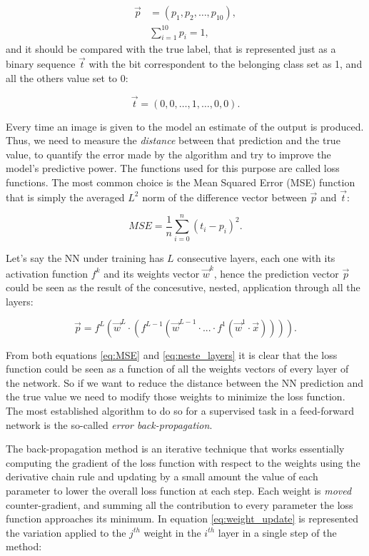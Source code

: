 \documentclass[12pt,a4paper]{report}
\begin{document}
\begin{align}
    \vec p & = (p_1, p_2, \dots, p_{10}), \\
    &\sum_{i=1}^{10} p_i = 1,
\end{align}
and it should be compared with the true label, that is represented just as a binary sequence $\vec t$ with the bit correspondent to the belonging class set as 1, and all the others value set to 0:

\begin{equation}
    \vec t = (0,0,\dots, 1, \dots,0,0).
\end{equation}

Every time an image is given to the model an estimate of the output is produced. Thus, we need to measure the \textit{distance} between that prediction and the true value, to quantify the error made by the algorithm and try to improve the model's predictive power. The functions used for this purpose are called loss functions. The most common choice is the Mean Squared Error (MSE) function that is simply the averaged $L^2$ norm of the difference vector between $\vec p$ and $\vec t$:

\begin{equation}
    MSE = \frac{1}{n} \sum_{i=0}^{n} (t_i - p_i)^2.
    \label{eq:MSE}
\end{equation}

Let's say the NN under training has $L$ consecutive layers, each one with its activation function $f^k$ and its weights vector $\vec w^k$, hence the prediction vector $\vec p$ could be seen as the result of the concesutive, nested, application through all the layers:

\begin{equation}
    \vec p = f^L(\vec w^L \cdot (f^{L-1}(\vec w^{L-1} \cdot ... \cdot f^1(\vec w^1 \cdot \vec x)))).
    \label{eq:neste_layers}
\end{equation}

From both equations \ref{eq:MSE} and \ref{eq:neste_layers} it is clear that the loss function could be seen as a function of all the weights vectors of every layer of the network. So if we want to reduce the distance between the NN prediction and the true value we need to modify those weights to minimize the loss function. The most established algorithm to do so for a supervised task in a feed-forward network is the so-called \textit{error back-propagation}.

The back-propagation method is an iterative technique that works essentially computing the gradient of the loss function with respect to the weights using the derivative chain rule and updating by a small amount the value of each parameter to lower the overall loss function at each step. Each weight is  \textit{moved} counter-gradient, and summing all the contribution to every parameter the loss function approaches its minimum. In equation \ref{eq:weight_update} is represented the variation applied to the $j^{th}$ weight in the $i^{th}$ layer in a single step of the method:
\end{document}
